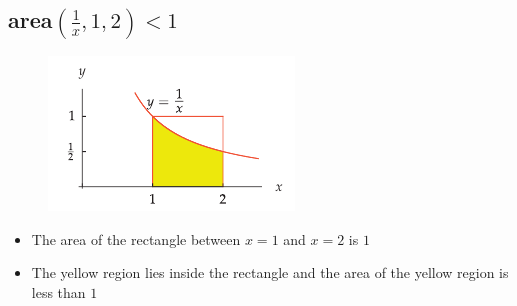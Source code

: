 \subsection{area\((\frac{1}{x},1,2) < 1 \) }
\begin{figure}
  \includegraphics[scale=0.8]{pics/e_2.png}
\end{figure}
\begin{itemize}
  \item The area of the rectangle between \(x=1\) and \(x=2\) is \(1\)
  \item The yellow region lies inside the rectangle and the area of the yellow region is less than \(1\)
\end{itemize}

